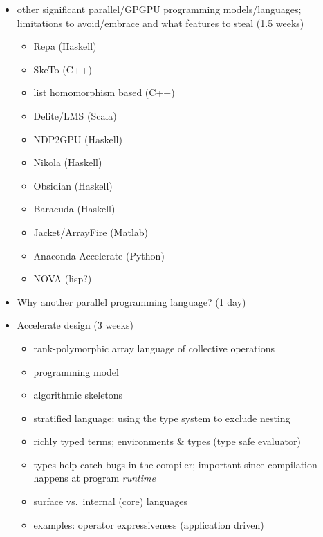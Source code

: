 \begin{itemize}
\item other significant parallel/GPGPU programming models/languages; limitations
    to avoid/embrace and what features to steal (1.5 weeks)
    \begin{itemize}
        \item Repa \cite{Keller:2010er,Lippmeier:2011cd,Lippmeier:2012gx} (Haskell)
        \item SkeTo \cite{Matsuzaki:2011ew} (C++)
        \item list homomorphism based \cite{Sato:2009cq} (C++)
        \item Delite/LMS \cite{Rompf:2013er} (Scala)
        \item NDP2GPU \cite{Bergstrom:2012bi} (Haskell)
        \item Nikola \cite{Mainland:2010vj} (Haskell)
        \item Obsidian \cite{Svensson:2008a,Claessen:2012hl} (Haskell)
        \item Baracuda \cite{Larsen:2011fa} (Haskell)
        \item Jacket/ArrayFire \cite{AccelerEyes:vq} (Matlab)
        \item Anaconda Accelerate \cite{AnacondaAccelerate:2013vn} (Python)
        \item NOVA \cite{Collins:2013wn} (lisp?)
    \end{itemize}

    \item Why another parallel programming language? (1 day)

    \item Accelerate design (3 weeks)
        \begin{itemize}
            \item rank-polymorphic array language of collective operations
            \item programming model
            \item algorithmic skeletons
            \item stratified language: using the type system to exclude nesting
            \item richly typed terms; environments \& types (type safe evaluator)
            \item types help catch bugs in the compiler; important since
                compilation happens at program \emph{runtime}
            \item surface vs.\ internal (core) languages
            \item examples: operator expressiveness (application driven)
        \end{itemize}

\end{itemize}


